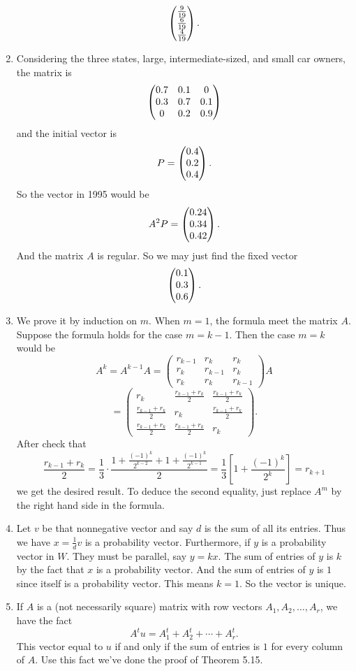 \begin{enumerate}
\[\begin{pmatrix}\frac{9}{19}\cr \frac{6}{19}\cr \frac{4}{19}\end{pmatrix}.\]
\item Considering the three states, large, intermediate-sized, and small car owners, the matrix is 
\[\begin{pmatrix}0.7 & 0.1 & 0\cr 0.3 & 0.7 & 0.1\cr 0 & 0.2 & 0.9\end{pmatrix}\]
and the initial vector is 
\[P=\begin{pmatrix}0.4\cr 0.2\cr 0.4\end{pmatrix}.\]
So the vector in 1995 would be 
\[A^2P=\begin{pmatrix}0.24\cr 0.34\cr 0.42\end{pmatrix}.\]
And the matrix $A$ is regular. So we may just find the fixed vector 
\[\begin{pmatrix}0.1\cr 0.3\cr 0.6\end{pmatrix}.\]
\item We prove it by induction on $m$. When $m=1$, the formula meet the matrix $A$. Suppose the formula holds for the case $m=k-1$. Then the case $m=k$ would be 
\[A^k=A^{k-1}A=\begin{pmatrix}r_{k-1}&r_k&r_k\\r_k&r_{k-1}&r_k\\r_k&r_k&r_{k-1}\end{pmatrix}A\]
\[=\begin{pmatrix}r_k&\frac{r_{k-1}+r_k}{2}&\frac{r_{k-1}+r_k}{2}\\\frac{r_{k-1}+r_k}{2}&r_k&\frac{r_{k-1}+r_k}{2}\\\frac{r_{k-1}+r_k}{2}&\frac{r_{k-1}+r_k}{2}&r_k\end{pmatrix}.\]
After check that 
\[\frac{r_{k-1}+r_k}{2}=\frac{1}{3}\cdot \frac{1+\frac{(-1)^k}{2^{k-2}}+1+\frac{(-1)^k}{2^{k-1}}}{2}=\frac{1}{3}[1+\frac{(-1)^k}{2^{k}}]=r_{k+1}\]
we get the desired result. To deduce the second equality, just replace $A^m$ by the right hand side in the formula.
\item Let $v$ be that nonnegative vector and say $d$ is the sum of all its entries. Thus we have $x=\frac{1}{d}v$ is a probability vector. Furthermore, if $y$ is a probability vector in $W$. They must be parallel, say $y=kx$. The sum of entries of $y$ is $k$ by the fact that $x$ is a probability vector. And the sum of entries of $y$ is $1$ since itself is a probability vector. This means $k=1$. So the vector is unique.
\item If $A$ is a (not necessarily square) matrix with row vectors $A_1,A_2,\ldots ,A_r$, we have the fact 
\[A^tu=A_1^t+A_2^t+\cdots +A_r^t.\]
This vector equal to $u$ if and only if the sum of entries is $1$ for every column of $A$. Use this fact we've done the proof of Theorem 5.15.


\end{enumerate}
